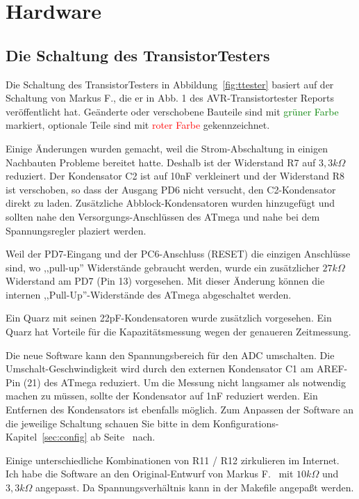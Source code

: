 \chapter{Hardware}

\section{Die Schaltung des TransistorTesters}
\label{sec:hardware}
Die Schaltung des TransistorTesters in Abbildung~\ref{fig:ttester} basiert auf der Schaltung von
Markus F., die er in Abb. 1 des AVR-Transistortester Reports \cite{Frejek} veröffentlicht hat.
Geänderte oder verschobene Bauteile sind mit \textcolor{green}{grüner Farbe} markiert, optionale Teile sind
mit \textcolor{red}{roter Farbe} gekennzeichnet.

Einige Änderungen wurden gemacht, weil die Strom-Abschaltung in einigen Nachbauten Probleme
bereitet hatte.
Deshalb ist der Widerstand R7 auf \(3,3k\Omega\) reduziert. 
Der Kondensator C2 ist auf 10nF verkleinert und der Widerstand R8 ist verschoben, so dass der
Ausgang PD6 nicht versucht, den C2-Kondensator direkt zu laden.
Zusätzliche Abblock-Kondensatoren wurden hinzugefügt und sollten nahe den Versorgungs-Anschlüssen
des ATmega und nahe bei dem Spannungsregler plaziert werden.

Weil der PD7-Eingang und der PC6-Anschluss (RESET) die einzigen Anschlüsse sind, wo
,,pull-up'' Widerstände gebraucht werden, wurde ein zusätzlicher \(27k\Omega\) Widerstand am PD7 (Pin 13) vorgesehen.
Mit dieser Änderung können die internen ,,Pull-Up''-Widerstände des ATmega abgeschaltet werden.

Ein Quarz mit seinen 22pF-Kondensatoren wurde zusätzlich vorgesehen.
Ein Quarz hat Vorteile für die Kapazitätsmessung wegen der genaueren Zeitmessung.

Die neue Software kann den Spannungsbereich für den ADC umschalten. Die Um\-schalt-Ge\-schwin\-dig\-keit
wird durch den externen Kondensator C1 am AREF-Pin (21) des ATmega reduziert.
Um die Messung nicht langsamer als notwendig machen zu müssen, sollte der Kondensator auf
1nF reduziert werden. Ein Entfernen des Kondensators ist ebenfalls möglich.
Zum Anpassen der Software an die jeweilige Schaltung schauen Sie bitte in dem
Kon\-fi\-gura\-tions-Kapitel~\ref{sec:config} ab Seite~\pageref{sec:config} nach. 

Einige unterschiedliche Kombinationen von R11 / R12 zirkulieren im Internet.
Ich habe die Software an den Original-Entwurf von Markus F.~\cite{Frejek} mit \(10k\Omega\) und \(3,3k\Omega\) angepasst.
Da Spannungsverhältnis kann in der Makefile angepaßt werden.

